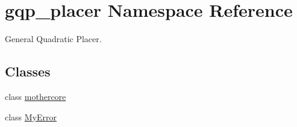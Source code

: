 \hypertarget{namespacegqp__placer}{}\section{gqp\+\_\+placer Namespace Reference}
\label{namespacegqp__placer}


General Quadratic Placer.  


\subsection*{Classes}
\begin{DoxyCompactItemize}
\item 
class \hyperlink{classgqp__placer_1_1mothercore}{mothercore}
\item 
class \hyperlink{classgqp__placer_1_1MyError}{My\+Error}
\end{DoxyCompactItemize}
